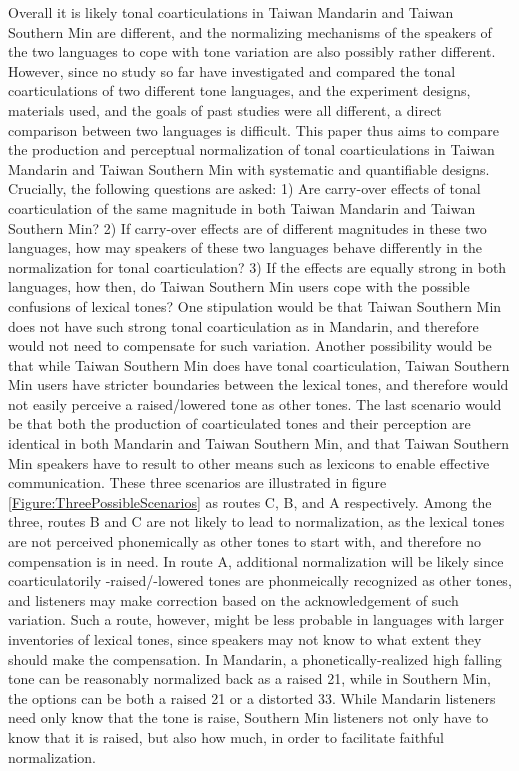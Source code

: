 \documentclass[12pt]{report}
\begin{document}
\begin{CJK}{UTF8}{bsmi}
Overall it is likely tonal coarticulations in Taiwan Mandarin and Taiwan Southern Min are different, and the normalizing mechanisms of the speakers of the two languages to cope with tone variation are also possibly rather different. However, since no study so far have investigated and compared the tonal coarticulations of two different tone languages, and the experiment designs, materials used, and the goals of past studies were all different, a direct comparison between two languages is difficult. This paper thus aims to compare the production and perceptual normalization of tonal coarticulations in Taiwan Mandarin and Taiwan Southern Min with systematic and quantifiable designs. Crucially, the following questions are asked: 1) Are carry-over effects of tonal coarticulation of the same magnitude in both Taiwan Mandarin and Taiwan Southern Min? 2) If carry-over effects are of different magnitudes in these two languages, how may speakers of these two languages behave differently in the normalization for tonal coarticulation? 3) If the effects are equally strong in both languages, how then, do Taiwan Southern Min users cope with the possible confusions of lexical tones? One stipulation would be that Taiwan Southern Min does not have such strong tonal coarticulation as in Mandarin, and therefore would not need to compensate for such variation. Another possibility would be that while Taiwan Southern Min does have tonal coarticulation, Taiwan Southern Min users have stricter boundaries between the lexical tones, and therefore would not easily perceive a raised/lowered tone as other tones. The last scenario would be that both the production of coarticulated tones and their perception are identical in both Mandarin and Taiwan Southern Min, and that Taiwan Southern Min speakers have to result to other means such as lexicons to enable effective communication. These three scenarios are illustrated in figure \ref{Figure:ThreePossibleScenarios} as routes C, B, and A respectively. Among the three, routes B and C are not likely to lead to normalization, as the lexical tones are not perceived phonemically as other tones to start with, and therefore no compensation is in need. In route A, additional normalization will be likely since coarticulatorily -raised/-lowered tones are phonmeically recognized as other tones, and listeners may make correction based on the acknowledgement of such variation. Such a route, however, might be less probable in languages with larger inventories of lexical tones, since speakers may not know to what extent they should make the compensation. In Mandarin, a phonetically-realized high falling tone can be reasonably normalized back as a raised 21, while in Southern Min, the options can be both a raised 21 or a distorted 33. While Mandarin listeners need only know that the tone is raise, Southern Min listeners not only have to know that it is raised, but also how much, in order to facilitate faithful normalization.


\end{CJK}
\end{document}
